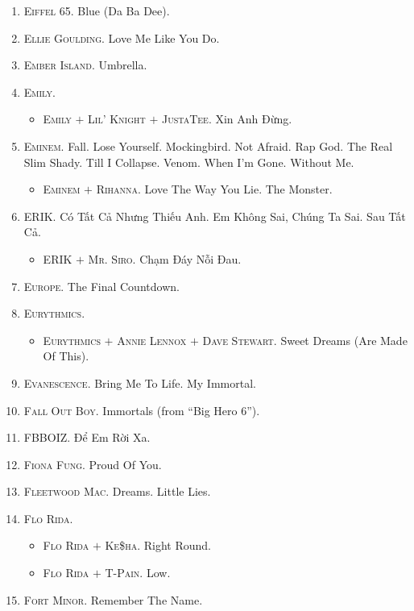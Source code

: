 \documentclass[oneside]{book}
\numberwithin{equation}{section}
\begin{document}
\begin{enumerate}
\begin{itemize}
	\end{itemize}
	\item \textsc{Eiffel 65.} Blue (Da Ba Dee).
	\item \textsc{Ellie Goulding.} Love Me Like You Do.
	\item \textsc{Ember Island.} Umbrella.
	\item \textsc{Emily.}
	\begin{itemize}
		\item \textsc{Emily $+$ Lil' Knight $+$ JustaTee.} Xin Anh Đừng.
	\end{itemize}
	\item \textsc{Eminem.} Fall. Lose Yourself. Mockingbird. Not Afraid. Rap God. The Real Slim Shady. Till I Collapse. Venom. When I'm Gone. Without Me.
	\begin{itemize}
		\item \textsc{Eminem $+$ Rihanna.} Love The Way You Lie. The Monster.
	\end{itemize}
	\item \textsc{ERIK.} Có Tất Cả Nhưng Thiếu Anh. Em Không Sai, Chúng Ta Sai. Sau Tất Cả.
	\begin{itemize}
		\item \textsc{ERIK $+$ Mr. Siro.} Chạm Đáy Nỗi Đau.
	\end{itemize}
	\item \textsc{Europe.} The Final Countdown.
	\item \textsc{Eurythmics.}
	\begin{itemize}
		\item \textsc{Eurythmics $+$ Annie Lennox $+$ Dave Stewart.} Sweet Dreams (Are Made Of This).
	\end{itemize}
	\item \textsc{Evanescence.} Bring Me To Life. My Immortal.
	\item \textsc{Fall Out Boy.} Immortals (from ``Big Hero 6'').
	\item \textsc{FBBOIZ.} Để Em Rời Xa.
	\item \textsc{Fiona Fung.} Proud Of You.
	\item \textsc{Fleetwood Mac.} Dreams. Little Lies.
	\item \textsc{Flo Rida.}
	\begin{itemize}
		\item \textsc{Flo Rida $+$ Ke\$ha.} Right Round.
		\item \textsc{Flo Rida $+$ T-Pain.} Low.
	\end{itemize}
	\item \textsc{Fort Minor.} Remember The Name.

\end{enumerate}
\end{document}
